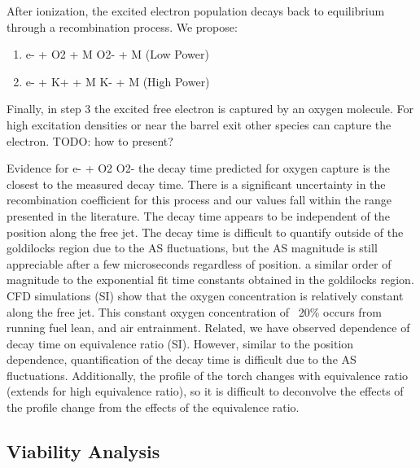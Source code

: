 After ionization, the excited electron population decays back to equilibrium through a recombination process. We propose: 

\begin{enumerate}
\item e- + O2 + M \rightarrow O2- + M (Low Power)
\item e- + K+ + M \rightarrow K- + M (High Power)
\end{enumerate}

Finally, in step 3 the excited free electron is captured by an oxygen molecule. For high excitation densities or near the barrel exit other species can capture the electron. TODO: how to present? 

\begin{outline}
    
\1 Evidence for e- + O2 \rightarrow O2-
    \2 the decay time predicted for oxygen capture is the closest to the measured decay time. There is a significant uncertainty in the recombination coefficient for this process and our values fall within the range presented in the literature. 
    \2 The decay time appears to be independent of the position along the free jet. The decay time is difficult to quantify outside of the goldilocks region due to the AS fluctuations, but the AS magnitude is still appreciable after a few microseconds regardless of position. a similar order of magnitude to the exponential fit time constants obtained in the goldilocks region. CFD simulations (SI) show that the oxygen concentration is relatively constant along the free jet. This constant oxygen concentration of ~20\% occurs from running fuel lean, and air entrainment. 
    \2 Related, we have observed dependence of decay time on equivalence ratio (SI). However, similar to the position dependence, quantification of the decay time is difficult due to the AS fluctuations. Additionally, the profile of the torch changes with equivalence ratio (extends for high equivalence ratio), so it is difficult to deconvolve the effects of the profile change from the effects of the equivalence ratio.
\end{outline}



\subsection{Viability Analysis}

